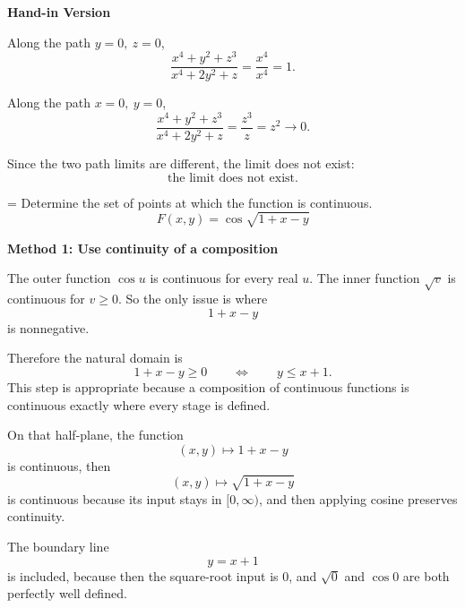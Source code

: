 \documentclass[a4paper,12pt,twocolumn]{article}
\newlength{\problemnumberwidth}
\newenvironment{solutionbox}{\begin{framed}}{\end{framed}}
\newcommand{\problem}[3]{%
  \Needspace{10\baselineskip}%
  \phantomsection\label{#1}%
  \par\vspace{0.8em}%
  \noindent
  \hangindent=\problemnumberwidth
  \hangafter=1
  \makebox[\problemnumberwidth][l]{\textbf{#2.}}#3\par
}
\begin{document}
\begin{solutionbox}
\textbf{Hand-in Version}

Along the path \(y=0,\ z=0\),
\[
\frac{x^4+y^2+z^3}{x^4+2y^2+z}
=\frac{x^4}{x^4}=1.
\]

Along the path \(x=0,\ y=0\),
\[
\frac{x^4+y^2+z^3}{x^4+2y^2+z}
=\frac{z^3}{z}=z^2\to 0.
\]

Since the two path limits are different, the limit does not exist:
\[
\boxed{\text{the limit does not exist}.}
\]
\end{solutionbox}

\problem{prob:14-2-42}{42}{Determine the set of points at which the function is continuous.
\[
F(x,y)=\cos\sqrt{1+x-y}
\]}

\begin{solutionbox}
\textbf{Method 1: Use continuity of a composition}

\begin{steps}
\item The outer function \(\cos u\) is continuous for every real \(u\). The inner function \(\sqrt{v}\) is continuous for \(v\ge 0\). So the only issue is where
\[
1+x-y
\]
is nonnegative.

\item Therefore the natural domain is
\[
1+x-y\ge 0
\qquad\Longleftrightarrow\qquad
y\le x+1.
\]
This step is appropriate because a composition of continuous functions is continuous exactly where every stage is defined.

\item On that half-plane, the function
\[
(x,y)\mapsto 1+x-y
\]
is continuous, then
\[
(x,y)\mapsto \sqrt{1+x-y}
\]
is continuous because its input stays in \([0,\infty)\), and then applying cosine preserves continuity.

\item The boundary line
\[
y=x+1
\]
is included, because then the square-root input is \(0\), and \(\sqrt{0}\) and \(\cos 0\) are both perfectly well defined.
\end{steps}
\end{solutionbox}
\end{document}
